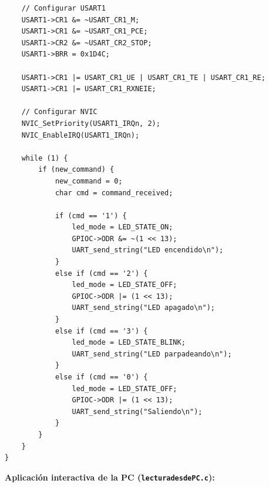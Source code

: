 \documentclass{plantilla}
\begin{document}
\begin{lstlisting}
    // Configurar USART1
    USART1->CR1 &= ~USART_CR1_M;     
    USART1->CR1 &= ~USART_CR1_PCE;   
    USART1->CR2 &= ~USART_CR2_STOP;  
    USART1->BRR = 0x1D4C;            

    USART1->CR1 |= USART_CR1_UE | USART_CR1_TE | USART_CR1_RE;
    USART1->CR1 |= USART_CR1_RXNEIE;

    // Configurar NVIC
    NVIC_SetPriority(USART1_IRQn, 2); 
    NVIC_EnableIRQ(USART1_IRQn);

    while (1) {
        if (new_command) {
            new_command = 0;
            char cmd = command_received;

            if (cmd == '1') {
                led_mode = LED_STATE_ON;
                GPIOC->ODR &= ~(1 << 13);
                UART_send_string("LED encendido\n");
            } 
            else if (cmd == '2') {
                led_mode = LED_STATE_OFF;
                GPIOC->ODR |= (1 << 13);
                UART_send_string("LED apagado\n");
            } 
            else if (cmd == '3') {
                led_mode = LED_STATE_BLINK;
                UART_send_string("LED parpadeando\n");
            } 
            else if (cmd == '0') {
                led_mode = LED_STATE_OFF;
                GPIOC->ODR |= (1 << 13);
                UART_send_string("Saliendo\n");
            }
        }
    }
}
\end{lstlisting}
\noindent\textbf{Aplicación interactiva de la PC (\texttt{lecturadesdePC.c}):}
\end{document}
